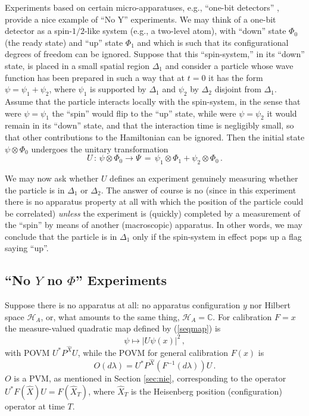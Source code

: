 \documentclass[12pt]{article}
\newcommand{\wf}{wave function}
\newcommand{\lam}{\lambda}
\newcommand{\ot}{\otimes}
\renewcommand{\H}{\mbox{$\mathcal{H}$}}
\newcommand{\CC}{\mathbb{C}}
\begin{document}
Experiments based on certain micro-apparatuses, e.g., ``one-bit
detectors'' \cite{SEW91}, provide a nice example of ``No Y''
experiments.  We may think of a one-bit detector as a spin-$1/2$-like
system (e.g., a two-level atom), with ``down'' state $\Phi_{0}$ (the
ready state) and ``up'' state $\Phi_{1}$ and which is such that its
configurational degrees of freedom can be ignored.  Suppose that this
``spin-system,'' in its ``down'' state, is placed in a small spatial
region $\Delta_1$ and consider a particle whose \wf{} has been
prepared in such a way that at $t=0$ it has the form $\psi = \psi_1 +
\psi_2$, where $\psi_{1}$ is supported by $\Delta_1$ and $\psi_{2}$ by
$\Delta_2$ disjoint {}from $\Delta_1$.  Assume that the particle
interacts locally with the spin-system, in the sense that were
$\psi=\psi_1$ the ``spin'' would flip to the ``up'' state, while were
$\psi=\psi_2$ it would remain in its ``down'' state, and that the
interaction time is negligibly small, so that other contributions to
the Hamiltonian can be ignored.  Then the initial state $\psi \ot
\Phi_0$ undergoes the unitary transformation
\begin{equation}
\label{unos}
U\,:\,\psi  \ot \Phi_0  {\to}
\Psi \,=\, \psi_{1} \ot \Phi_1  + \psi_{2} \ot\Phi_0 \,.
\end{equation}

We may now ask whether $U$ defines an experiment genuinely measuring
whether the particle is in $\Delta_{1}$ or $\Delta_{2}$.  The answer
of course is no (since in this experiment there is no apparatus
property at all with which the position of the particle could be
correlated) \emph{unless} the experiment is (quickly) completed by a
measurement of the ``spin'' by means of another (macroscopic)
apparatus.  In other words, we may conclude that the particle is in
$\Delta_{1}$ only if the spin-system in effect pops up a flag saying
``up''.

\subsection{``No $Y$ no $\Phi$'' Experiments}\label{secnoy}
Suppose there is no apparatus at all: no apparatus configuration $y$
nor Hilbert space $\H_A$, or, what amounts to the same thing,
$\H_{A}=\CC$. For calibration $F=x$ the measure-valued quadratic map
defined by (\ref{seqmap}) is $$
\psi \mapsto | U\psi(x)|^{2}\,,$$
with
POVM $U^* P^{\hat{X}}U$, while the POVM for general calibration $F(x)$
is
\begin{equation}
O(d\lam) = U^{*} P^{\hat{X}}(F^{-1}(d\lam)) U\,.
\label{eq:noYnophi}
\end{equation}
$O$ is a PVM, as mentioned in Section \ref{sec:nie}, corresponding to
the operator $U^* F(\hat{X})U= F(\hat{X}_T)$, where $\hat{X}_T$ is the
Heisenberg position (configuration) operator at time $T$.
\end{document}
